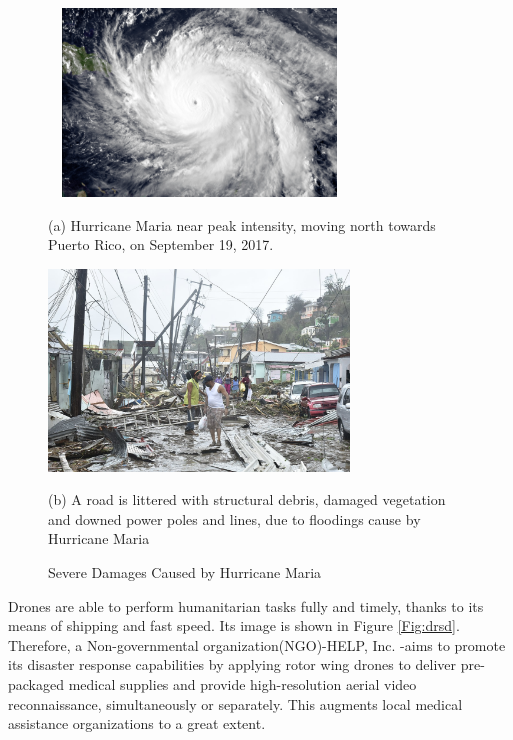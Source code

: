 \documentclass{mcmthesis}
\begin{document}
\begin{figure}[htbp]
    \begin{minipage}{0.45\linewidth}
      \centerline{\includegraphics[height = 5.0cm,width=8cm]{figures/hurricanemaria.png}}
      \caption*{(a) Hurricane Maria near peak intensity, moving north towards Puerto Rico, on September 19, 2017.}
    \end{minipage}
    \hspace{0.5in}
    \begin{minipage}{0.45\linewidth}
      \centerline{\includegraphics[height=4.9
      cm,width=8cm]{figures/hurricanedamage.png}}
      \caption*{(b) A road is littered with structural debris, damaged vegetation and downed power poles and lines, due to floodings cause by Hurricane Maria}
    \end{minipage}
    \caption{Severe Damages Caused by Hurricane Maria\cite{HurricaneMariaWiki}}
    \label{Fig:hurr}
\end{figure}

Drones are able to perform humanitarian tasks fully and timely, thanks to its means of shipping and fast speed. Its image is shown in Figure \ref{Fig:drsd}. Therefore, a Non-governmental organization(NGO)-HELP, Inc. -aims to promote its disaster response capabilities by applying rotor wing drones to deliver pre-packaged medical supplies and provide high-resolution aerial video reconnaissance, simultaneously or separately. This augments local medical assistance organizations to a great extent.
\end{document}

